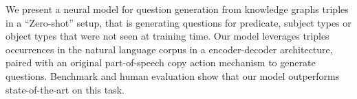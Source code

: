 We present a neural model for question generation from knowledge graphs triples in a ``Zero-shot'' setup, that is generating questions for predicate, subject types or object types that were not seen at training time. Our model leverages triples occurrences in the natural language corpus in a encoder-decoder architecture, paired with an original part-of-speech copy action mechanism to generate questions. Benchmark and human evaluation show that our model outperforms state-of-the-art on this task.
